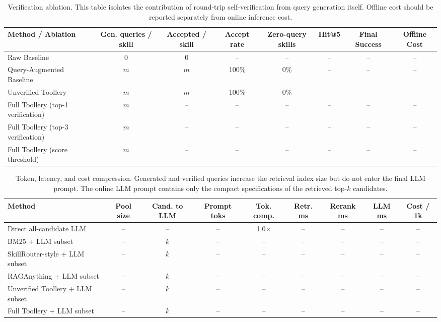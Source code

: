 \begin{table}[t]
\centering
\small
\begin{tabular}{lccccccc}
\hline
\textbf{Method / Ablation} &
\textbf{Gen. queries / skill} &
\textbf{Accepted / skill} &
\textbf{Accept rate} &
\textbf{Zero-query skills} &
\textbf{Hit@5} &
\textbf{Final Success} &
\textbf{Offline Cost} \\
\hline
Raw Baseline & 0 & 0 & -- & -- & -- & -- & -- \\
Query-Augmented Baseline & $m$ & $m$ & 100\% & 0\% & -- & -- & -- \\
Unverified Toollery & $m$ & $m$ & 100\% & 0\% & -- & -- & -- \\
Full Toollery (top-1 verification) & $m$ & -- & -- & -- & -- & -- & -- \\
Full Toollery (top-3 verification) & $m$ & -- & -- & -- & -- & -- & -- \\
Full Toollery (score threshold) & $m$ & -- & -- & -- & -- & -- & -- \\
\hline
\end{tabular}
\caption{Verification ablation. This table isolates the contribution of
round-trip self-verification from query generation itself. Offline cost should be
reported separately from online inference cost.}
\label{tab:verification-ablation}
\end{table}

\begin{table}[t]
\centering
\small
\begin{tabular}{lcccccccc}
\hline
\textbf{Method} &
\textbf{Pool size} &
\textbf{Cand. to LLM} &
\textbf{Prompt toks} &
\textbf{Tok. comp.} &
\textbf{Retr. ms} &
\textbf{Rerank ms} &
\textbf{LLM ms} &
\textbf{Cost / 1k} \\
\hline
Direct all-candidate LLM & -- & -- & -- & 1.0$\times$ & -- & -- & -- & -- \\
BM25 + LLM subset & -- & $k$ & -- & -- & -- & -- & -- & -- \\
SkillRouter-style + LLM subset & -- & $k$ & -- & -- & -- & -- & -- & -- \\
RAGAnything + LLM subset & -- & $k$ & -- & -- & -- & -- & -- & -- \\
Unverified Toollery + LLM subset & -- & $k$ & -- & -- & -- & -- & -- & -- \\
Full Toollery + LLM subset & -- & $k$ & -- & -- & -- & -- & -- & -- \\
\hline
\end{tabular}
\caption{Token, latency, and cost compression. Generated and verified queries
increase the retrieval index size but do not enter the final LLM prompt. The
online LLM prompt contains only the compact specifications of the retrieved
top-$k$ candidates.}
\label{tab:token-latency-compression}
\end{table}

